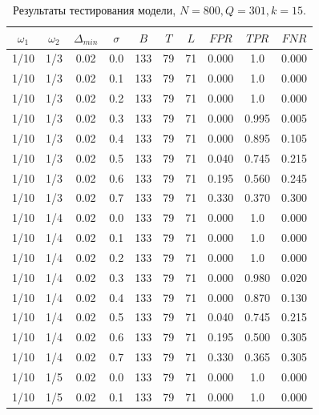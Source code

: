 \documentclass[specialist, substylefile = spbu.rtx,
			   subf, href, 12pt]{disser}
\begin{document}
\begin{table}[!hhh]
	\center
	\caption{Результаты тестирования модели, $ N = 800, Q=301, k=15 $.}
	\begin{tabular}{cccccccccc}
		\toprule
		$ \omega_1 $ & $ \omega_2 $ & $ \Delta_{min} $ & $ \sigma $ &    $ B $ &   $ T $ &   $ L $ &    $ FPR $ &    $ TPR $ &    $ FNR $ \\
		\midrule
		1/10 &     1/3 &        0.02 &     0.0 & 133 & 79 & 71 & 0.000 & 1.0 & 0.000 \\
		1/10 &     1/3 &        0.02 &     0.1 & 133 & 79 & 71 & 0.000 & 1.0 & 0.000 \\
		1/10 &     1/3 &        0.02 &     0.2 & 133 & 79 & 71 & 0.000 & 1.0 & 0.000 \\
		1/10 &     1/3 &        0.02 &     0.3 & 133 & 79 & 71 & 0.000 & 0.995 & 0.005 \\
		1/10 &     1/3 &        0.02 &     0.4 & 133 & 79 & 71 & 0.000 & 0.895 & 0.105 \\
		1/10 &     1/3 &        0.02 &     0.5 & 133 & 79 & 71 & 0.040 & 0.745 & 0.215 \\
		1/10 &     1/3 &        0.02 &     0.6 & 133 & 79 & 71 & 0.195 & 0.560 & 0.245 \\
		1/10 &     1/3 &        0.02 &     0.7 & 133 & 79 & 71 & 0.330 & 0.370 & 0.300 \\
		\hline
		1/10 &     1/4 &        0.02 &     0.0 & 133 & 79 & 71 & 0.000 & 1.0 & 0.000 \\
		1/10 &     1/4 &        0.02 &     0.1 & 133 & 79 & 71 & 0.000 & 1.0 & 0.000 \\
		1/10 &     1/4 &        0.02 &     0.2 & 133 & 79 & 71 & 0.000 & 1.0 & 0.000 \\
		1/10 &     1/4 &        0.02 &     0.3 & 133 & 79 & 71 & 0.000 & 0.980 & 0.020 \\
		1/10 &     1/4 &        0.02 &     0.4 & 133 & 79 & 71 & 0.000 & 0.870 & 0.130 \\
		1/10 &     1/4 &        0.02 &     0.5 & 133 & 79 & 71 & 0.040 & 0.745 & 0.215 \\
		1/10 &     1/4 &        0.02 &     0.6 & 133 & 79 & 71 & 0.195 & 0.500 & 0.305 \\
		1/10 &     1/4 &        0.02 &     0.7 & 133 & 79 & 71 & 0.330 & 0.365 & 0.305 \\
		\hline
		1/10 &     1/5 &        0.02 &     0.0 & 133 & 79 & 71 & 0.000 & 1.0 & 0.000 \\
		1/10 &     1/5 &        0.02 &     0.1 & 133 & 79 & 71 & 0.000 & 1.0 & 0.000 \\

\end{tabular}
\end{table}
\end{document}
